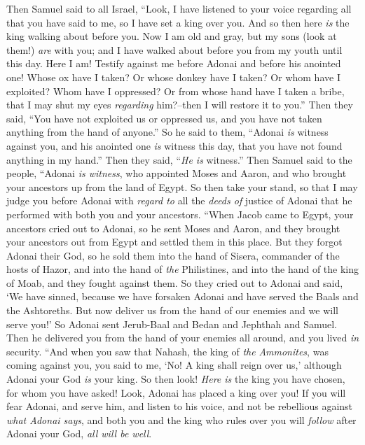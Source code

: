 \begin{biblechapter} %
 Then Samuel said to all Israel, “Look, I have listened to your voice regarding all that you have said to me, so I have set a king over you.
\verse And so then here \textit{is} the king walking about before you. Now I am old and gray, but my sons (look at them!) \textit{are} with you; and I have walked about before you from my youth until this day.
\verse Here I am! Testify against me before Adonai and before his anointed one! Whose ox have I taken? Or whose donkey have I taken? Or whom have I exploited? Whom have I oppressed? Or from whose hand have I taken a bribe, that I may shut my eyes \textit{regarding} him?–then I will restore it to you.”
\verse Then they said, “You have not exploited us or oppressed us, and you have not taken anything from the hand of anyone.”
\verse So he said to them, “Adonai \textit{is} witness against you, and his anointed one \textit{is} witness this day, that you have not found anything in my hand.” Then they said, “\textit{He is} witness.”
\verse Then Samuel said to the people, “Adonai \textit{is witness}, who appointed Moses and Aaron, and who brought your ancestors up from the land of Egypt.
\verse So then take your stand, so that I may judge you before Adonai with \textit{regard to} all the \textit{deeds of} justice of Adonai that he performed with both you and your ancestors.
\verse “When Jacob came to Egypt, your ancestors cried out to Adonai, so he sent Moses and Aaron, and they brought your ancestors out from Egypt and settled them in this place.
\verse But they forgot Adonai their God, so he sold them into the hand of Sisera, commander of the hosts of Hazor, and into the hand of \textit{the} Philistines, and into the hand of the king of Moab, and they fought against them.
\verse So they cried out to Adonai and said, ‘We have sinned, because we have forsaken Adonai and have served the Baals and the Ashtoreths. But now deliver us from the hand of our enemies and we will serve you!’
\verse So Adonai sent Jerub-Baal and Bedan and Jephthah and Samuel. Then he delivered you from the hand of your enemies all around, and you lived \textit{in} security.
\verse “And when you saw that Nahash, the king of \textit{the} \textit{Ammonites}, was coming against you, you said to me, ‘No! A king shall reign over us,’ although Adonai your God \textit{is} your king.
\verse So then look! \textit{Here is} the king you have chosen, for whom you have asked! Look, Adonai has placed a king over you!
\verse If you will fear Adonai, and serve him, and listen to his voice, and not be rebellious against \textit{what Adonai says}, and both you and the king who rules over you will \textit{follow} after Adonai your God, \textit{all will be well}.

\end{biblechapter}

